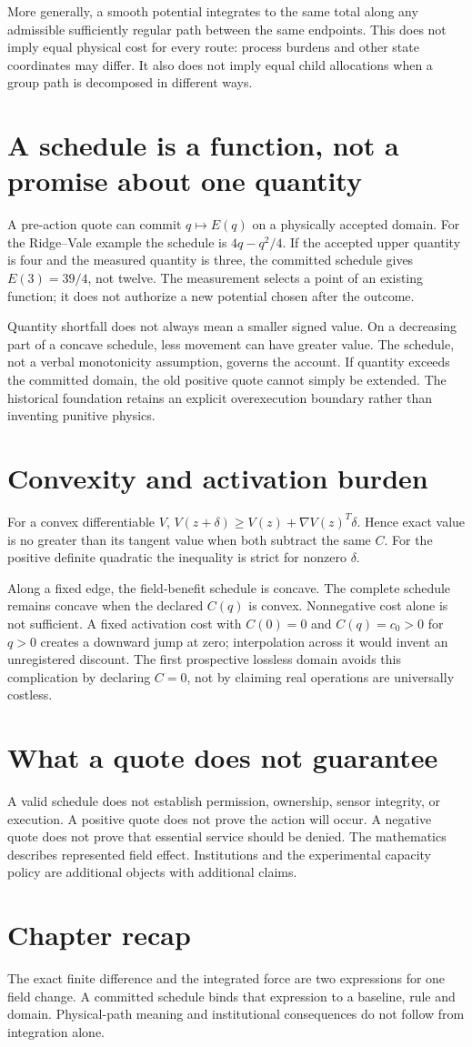More generally, a smooth potential integrates to the same total along any
admissible sufficiently regular path between the same endpoints. This does
not imply equal physical cost for every route: process burdens and other
state coordinates may differ. It also does not imply equal child allocations
when a group path is decomposed in different ways.

\section{A schedule is a function, not a promise about one quantity}
A pre-action quote can commit $q\mapsto E(q)$ on a physically accepted
domain. For the Ridge--Vale example the schedule is $4q-q^2/4$.
If the accepted upper quantity is four and the measured quantity is three,
the committed schedule gives $E(3)=39/4$, not twelve. The measurement selects
a point of an existing function; it does not authorize a new potential
chosen after the outcome.

Quantity shortfall does not always mean a smaller signed value. On a
decreasing part of a concave schedule, less movement can have greater value.
The schedule, not a verbal monotonicity assumption, governs the account.
If quantity exceeds the committed domain, the old positive quote cannot
simply be extended. The historical foundation retains an explicit
overexecution boundary rather than inventing punitive physics.

\section{Convexity and activation burden}
For a convex differentiable $V$,
$V(z+\delta)\geq V(z)+\nabla V(z)^T\delta$. Hence exact value is no
greater than its tangent value when both subtract the same $C$. For the
positive definite quadratic the inequality is strict for nonzero $\delta$.

Along a fixed edge, the field-benefit schedule is concave. The complete
schedule remains concave when the declared $C(q)$ is convex. Nonnegative
cost alone is not sufficient. A fixed activation cost with $C(0)=0$ and
$C(q)=c_0>0$ for $q>0$ creates a downward jump at zero; interpolation
across it would invent an unregistered discount. The first prospective
lossless domain avoids this complication by declaring $C=0$, not by
claiming real operations are universally costless.

\section{What a quote does not guarantee}
A valid schedule does not establish permission, ownership, sensor integrity,
or execution. A positive quote does not prove the action will occur. A
negative quote does not prove that essential service should be denied.
The mathematics describes represented field effect. Institutions and the
experimental capacity policy are additional objects with additional claims.

\section*{Chapter recap}
The exact finite difference and the integrated force are two expressions for
one field change. A committed schedule binds that expression to a baseline,
rule and domain. Physical-path meaning and institutional consequences do
not follow from integration alone.
